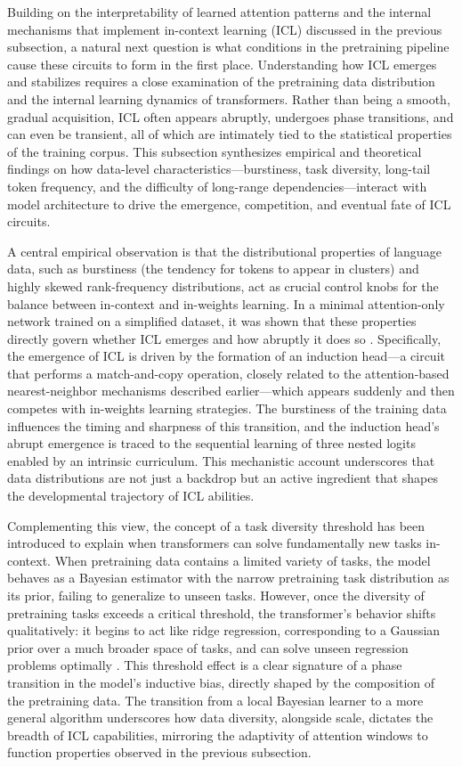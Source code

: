 \documentclass[11pt]{article}
\begin{document}
Building on the interpretability of learned attention patterns and the internal mechanisms that implement in-context learning (ICL) discussed in the previous subsection, a natural next question is what conditions in the pretraining pipeline cause these circuits to form in the first place. Understanding how ICL emerges and stabilizes requires a close examination of the pretraining data distribution and the internal learning dynamics of transformers. Rather than being a smooth, gradual acquisition, ICL often appears abruptly, undergoes phase transitions, and can even be transient, all of which are intimately tied to the statistical properties of the training corpus. This subsection synthesizes empirical and theoretical findings on how data-level characteristics---burstiness, task diversity, long-tail token frequency, and the difficulty of long-range dependencies---interact with model architecture to drive the emergence, competition, and eventual fate of ICL circuits.

A central empirical observation is that the distributional properties of language data, such as burstiness (the tendency for tokens to appear in clusters) and highly skewed rank-frequency distributions, act as crucial control knobs for the balance between in-context and in-weights learning. In a minimal attention-only network trained on a simplified dataset, it was shown that these properties directly govern whether ICL emerges and how abruptly it does so \cite{ref35}. Specifically, the emergence of ICL is driven by the formation of an induction head---a circuit that performs a match-and-copy operation, closely related to the attention-based nearest-neighbor mechanisms described earlier---which appears suddenly and then competes with in-weights learning strategies. The burstiness of the training data influences the timing and sharpness of this transition, and the induction head's abrupt emergence is traced to the sequential learning of three nested logits enabled by an intrinsic curriculum. This mechanistic account underscores that data distributions are not just a backdrop but an active ingredient that shapes the developmental trajectory of ICL abilities.

Complementing this view, the concept of a task diversity threshold has been introduced to explain when transformers can solve fundamentally new tasks in-context. When pretraining data contains a limited variety of tasks, the model behaves as a Bayesian estimator with the narrow pretraining task distribution as its prior, failing to generalize to unseen tasks. However, once the diversity of pretraining tasks exceeds a critical threshold, the transformer's behavior shifts qualitatively: it begins to act like ridge regression, corresponding to a Gaussian prior over a much broader space of tasks, and can solve unseen regression problems optimally \cite{ref31}. This threshold effect is a clear signature of a phase transition in the model's inductive bias, directly shaped by the composition of the pretraining data. The transition from a local Bayesian learner to a more general algorithm underscores how data diversity, alongside scale, dictates the breadth of ICL capabilities, mirroring the adaptivity of attention windows to function properties observed in the previous subsection.
\end{document}
